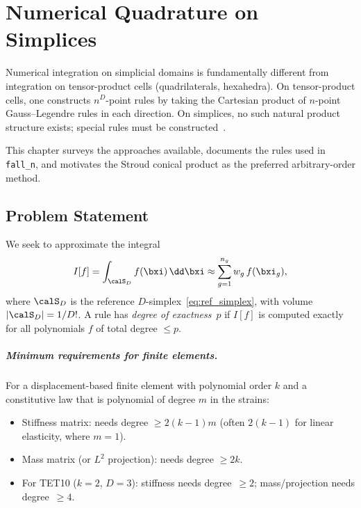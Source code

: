 
\chapter{Numerical Quadrature on Simplices}
\label{ch:quadrature}

Numerical integration on simplicial domains is fundamentally different from
integration on tensor-product cells (quadrilaterals, hexahedra).  On
tensor-product cells, one constructs $n^D$-point rules by taking the Cartesian
product of $n$-point Gauss--Legendre rules in each direction.  On simplices, no
such natural product structure exists; special rules must be
constructed~\cite{Stroud1971,Keast1986}.

This chapter surveys the approaches available, documents the rules used in
\texttt{fall\_n}, and motivates the Stroud conical product as the preferred
arbitrary-order method.


\section{Problem Statement}
\label{sec:quad_problem}

We seek to approximate the integral
\begin{equation}
  I[f] = \int_{\calS_D} f(\bxi)\,\dd\bxi
  \approx \sum_{g=1}^{n_g} w_g\, f(\bxi_g),
  \label{eq:quad_approx}
\end{equation}
where $\calS_D$ is the reference $D$-simplex~\eqref{eq:ref_simplex}, with
volume $|\calS_D| = 1/D!$.  A rule has \emph{degree of exactness}~$p$ if
$I[f]$ is computed exactly for all polynomials $f$ of total degree $\le p$.

\paragraph{Minimum requirements for finite elements.}
For a displacement-based finite element with polynomial order $k$ and a
constitutive law that is polynomial of degree $m$ in the strains:
\begin{itemize}[nosep]
  \item Stiffness matrix: needs degree $\ge 2(k-1)m$ (often $2(k-1)$ for
        linear elasticity, where $m=1$).
  \item Mass matrix (or $L^2$ projection): needs degree $\ge 2k$.
  \item For TET10 ($k=2$, $D=3$): stiffness needs degree~$\ge 2$; mass/projection
        needs degree~$\ge 4$.
\end{itemize}


